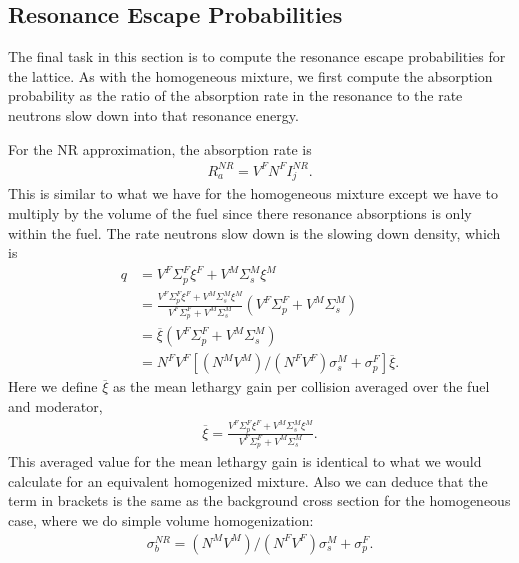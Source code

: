 \subsection{Resonance Escape Probabilities}

The final task in this section is to compute the resonance escape probabilities for the lattice. As with the homogeneous mixture, we first compute the absorption probability as the ratio of the absorption rate in the resonance to the rate neutrons slow down into that resonance energy.

For the NR approximation, the absorption rate is
\begin{align}
  R_a^{NR} = V^F N^F I_j^{NR} .
\end{align}
This is similar to what we have for the homogeneous mixture except we have to multiply by the volume of the fuel since there resonance absorptions is only within the fuel. The rate neutrons slow down is the slowing down density, which is
\begin{align}
  q 
  &= V^F \Sigma_p^F \xi^F +  V^M \Sigma_s^M \xi^M \nonumber \\
  &= \frac{ V^F \Sigma_p^F \xi^F +  V^M \Sigma_s^M \xi^M  }{ V^F \Sigma_p^F +  V^M \Sigma_s^M  } \left( V^F \Sigma_p^F +  V^M \Sigma_s^M \right) \nonumber \\
  &= \overline{\xi}  \left( V^F \Sigma_p^F +  V^M \Sigma_s^M \right) \nonumber \\
  &= N^F V^F \left[ (N^M V^M)/(N^F V^F) \sigma_s^M + \sigma_p^F \right] \overline{\xi} .
\end{align}
Here we define $\overline{\xi}$ as the mean lethargy gain per collision averaged over the fuel and moderator,
\begin{align}
  \overline{\xi} = \frac{ V^F \Sigma_p^F \xi^F +  V^M \Sigma_s^M \xi^M  }{ V^F \Sigma_p^F +  V^M \Sigma_s^M  } .
\end{align}
This averaged value for the mean lethargy gain is identical to what we would calculate for an equivalent homogenized mixture. Also we can deduce that the term in brackets is the same as the background cross section for the homogeneous case, where we do simple volume homogenization:
\begin{align}
  \sigma_b^{NR} = (N^M V^M)/(N^F V^F) \sigma_s^M + \sigma_p^F.
\end{align}

